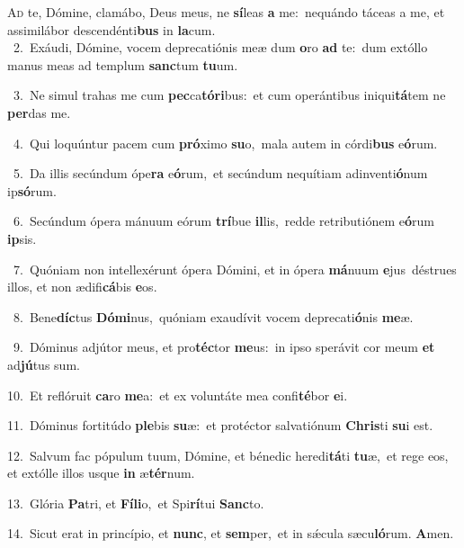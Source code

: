 \lettrine{\initial\textcolor{\initialcolor}{A}}{d} te, Dómine, clamábo, Deus meus, ne \textbf{sí}\-leas \textbf{a} me:~\star nequándo táceas a me, et assimilábor descendénti\textbf{bus} in \textbf{la}\-cum.\\
{\numbfont\textcolor{\numbcolor}{~2.}}~Exáudi, Dómine, vocem deprecatiónis meæ dum \textbf{o}\-ro \textbf{ad} te:~\star dum extóllo manus meas ad templum \textbf{sanc}\-tum \textbf{tu}\-um.\par
{\numbfont\textcolor{\numbcolor}{~3.}}~Ne simul trahas me cum \textbf{pec}\-ca\-\textbf{tó}\-\textbf{ri}bus:~\star et cum operántibus iniqui\-\textbf{tá}\-tem ne \textbf{per}\-das me.\par
{\numbfont\textcolor{\numbcolor}{~4.}}~Qui loquúntur pacem cum \textbf{pró}\-ximo \textbf{su}\-o,~\star mala autem in córdi\textbf{bus} e\-\textbf{ó}\-rum.\par
{\numbfont\textcolor{\numbcolor}{~5.}}~Da illis secúndum ópe\textbf{ra} e\-\textbf{ó}\-rum,~\star et secúndum nequítiam adinventi\-\textbf{ó}\-num ip\-\textbf{só}\-rum.\par
{\numbfont\textcolor{\numbcolor}{~6.}}~Secúndum ópera mánuum eórum \textbf{trí}\-bue \textbf{il}\-lis,~\star redde retributiónem e\-\textbf{ó}\-rum \textbf{ip}\-sis.\par
{\numbfont\textcolor{\numbcolor}{~7.}}~Quóniam non intellexérunt ópera Dómini, et in ópera \textbf{má}\-nuum \textbf{e}\-jus~\star déstrues illos, et non ædifi\-\textbf{cá}\-bis \textbf{e}\-os.\par
{\numbfont\textcolor{\numbcolor}{~8.}}~Bene\-\textbf{díc}\-tus \textbf{Dó}\-\textbf{mi}nus,~\star quóniam exaudívit vocem deprecati\-\textbf{ó}\-nis \textbf{me}\-æ.\par
{\numbfont\textcolor{\numbcolor}{~9.}}~Dóminus adjútor meus, et pro\-\textbf{téc}\-tor \textbf{me}\-us:~\star in ipso sperávit cor meum \textbf{et} ad\-\textbf{jú}\-tus sum.\par
{\numbfont\textcolor{\numbcolor}{10.}}~Et reflóruit \textbf{ca}\-ro \textbf{me}\-a:~\star et ex voluntáte mea confi\-\textbf{té}\-bor \textbf{e}\-i.\par
{\numbfont\textcolor{\numbcolor}{11.}}~Dóminus fortitúdo \textbf{ple}\-bis \textbf{su}\-æ:~\star et protéctor salvatiónum \textbf{Chris}\-ti \textbf{su}\-i est.\par
{\numbfont\textcolor{\numbcolor}{12.}}~Salvum fac pópulum tuum, Dómine, et bénedic heredi\-\textbf{tá}\-ti \textbf{tu}\-æ,~\star et rege eos, et extólle illos usque \textbf{in} æ\-\textbf{tér}\-num.\par
{\numbfont\textcolor{\numbcolor}{13.}}~Glória \textbf{Pa}\-tri, et \textbf{Fí}\-\textbf{li}o,~\star et Spi\-\textbf{rí}\-tui \textbf{Sanc}\-to.\par
{\numbfont\textcolor{\numbcolor}{14.}}~Sicut erat in princípio, et \textbf{nunc}\-, et \textbf{sem}\-per,~\star et in sǽcula sæcu\-\textbf{ló}\-rum. \textbf{A}\-men.\par
